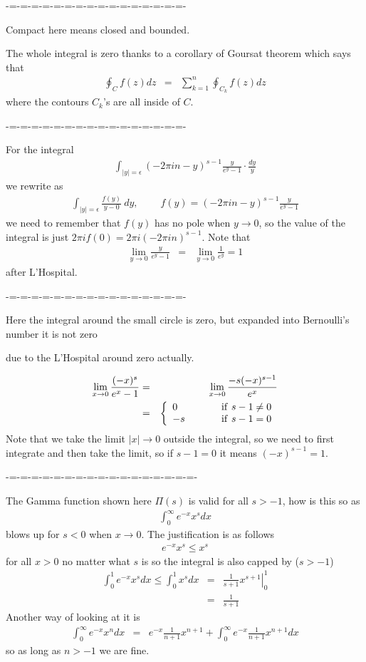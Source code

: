 \documentclass[aps,preprint,preprintnumbers,nofootinbib,showpacs,prd]{revtex4-1}
\newcommand{\nbea}{\begin{eqnarray*}}
\newcommand{\neea}{\end{eqnarray*}}
\begin{document}
-=-=-=-=-=-=-=-=-=-=-=-=-=-=-=-=-

Compact here means closed and bounded.

The whole integral is zero thanks to a corollary of Goursat theorem which says that
%
\nbea
\oint_C f(z) dz & = & \sum_{k=1}^n \oint_{C_k} f(z) dz
\neea
%
where the contours $C_k$'s are all inside of $C$.


-=-=-=-=-=-=-=-=-=-=-=-=-=-=-=-=-

For the integral
%
\nbea
\int_{|y|=\epsilon} (-2\pi i n - y)^{s-1} \frac{y}{e^y - 1} \cdot \frac{dy}{y}
\neea
%
we rewrite as
%
\nbea
\int_{|y|=\epsilon} \frac{f(y)}{y - 0} ~ dy, ~~~~~~~~~~ f(y) = (-2\pi i n - y)^{s-1} \frac{y}{e^y - 1}
\neea
%
we need to remember that $f(y)$ has no pole when $y\to 0$, so the value of the integral is just $2\pi i f(0) = 2\pi i(-2\pi i n)^{s-1}$. Note that
%
\nbea
\lim_{y\to0} \frac{y}{e^y - 1} & = & \lim_{y\to0} \frac{1}{e^y} = 1
\neea
%
after L'Hospital.



-=-=-=-=-=-=-=-=-=-=-=-=-=-=-=-=-

Here the integral around the small circle is zero, but expanded into Bernoulli's number it is not zero

due to the L'Hospital around zero actually.

%
\nbea
\lim_{x\to0} \frac{(-x)^s}{e^x - 1} & = & \lim_{x\to0} \frac{-s(-x)^{s-1}}{e^x} \\
& = & 
\left\{
\begin{array}{l c l}
0 & ~~~~~ &{\rm if~} s-1 \neq 0 \\
-s & ~~~~~ &{\rm if~} s-1 = 0
\end{array}
\right.
\neea
%
Note that we take the limit $|x|\to 0$ outside the integral, so we need to first integrate and then take the limit, so if $s-1=0$ it means $(-x)^{s-1} = 1$.

-=-=-=-=-=-=-=-=-=-=-=-=-=-=-=-=-=-

The Gamma function shown here $\Pi(s)$ is valid for all $s > -1$, how is this so as
%
\nbea
\int_0^\infty e^{-x} x^{s} dx
\neea
%
blows up for $s < 0$ when $x\to0$. The justification is as follows
%
\nbea
e^{-x} x^{s} \le x^s
\neea
%
for all $x > 0$ no matter what $s$ is so the integral is also capped by ($s > -1$)
%
\nbea
\int_0^1 e^{-x}x^s dx \le \int_0^1 x^s dx & = & \left.\frac{1}{s+1} x^{s+1} \right|_0^1 \\
& = & \frac{1}{s+1}
\neea
%
Another way of looking at it is
%
\nbea
\int_0^\infty e^{-x}x^n dx & = & e^{-x}\frac{1}{n+1}x^{n+1} + \int_0^\infty e^{-x}\frac{1}{n+1}x^{n+1} dx
\neea
%
so as long as $n>-1$ we are fine.
\end{document}
